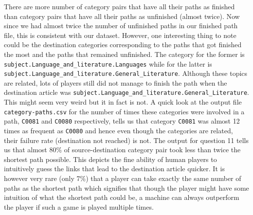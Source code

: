 \documentclass[letterpaper,12pt]{article}
\begin{document}
\bigskip

There are more number of category pairs that have all their paths as finished than category pairs that have all their paths as unfinished (almost twice). Now since we had almost twice the number of unfinished paths in our finished path file, this is consistent with our dataset. However, one interesting thing to note could be the destination categories corresponding to the paths that got finished the most and the paths that remained unfinished. The category for the former is \verb|subject.Language_and_literature.Languages| while for the latter is \verb|subject.Language_and_literature.General_Literature|. Although these topics are related, lots of players still did not manage to finish the path when the destination article was \verb|subject.Language_and_literature.General_Literature|. This might seem very weird but it in fact is not. A quick look at the output file \verb|category-paths.csv| for the number of times these categories were involved in a path, \verb|C0081| and \verb|C0080| respectively, tells us that category \verb|C0081| was almost 12 times as frequent as \verb|C0080| and hence even though the categories are related, their failure rate (destination not reached) is not. The output for question 11 tells us that almost 80\% of source-destination category pair took less than twice the shortest path possible. This depicts the fine ability of human players to intuitively guess the links that lead to the destination article quicker. It is however very rare (only 7\%) that a player can take exactly the same number of paths as the shortest path which signifies that though the player might have some intuition of what the shortest path could be, a machine can always outperform the player if such a game is played multiple times. 
\end{document}
